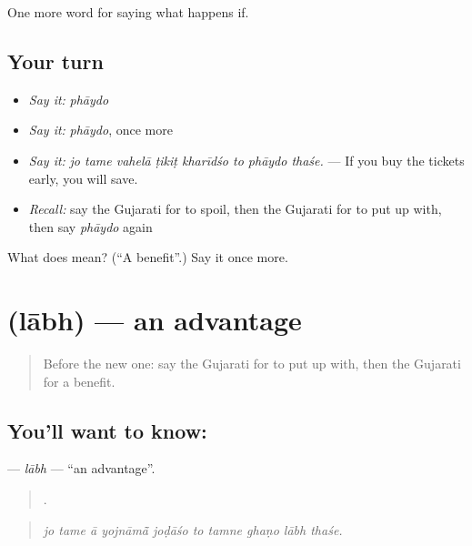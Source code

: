 \begin{grammarlens}[title={What you've built}]
One more word for saying what happens if.
\end{grammarlens}

\subsection*{Your turn}
\begin{itemize}
\raggedright
  \item \emph{Say it:} \emph{phāydo}
  \item \emph{Say it:} \emph{phāydo}, once more
  \item \emph{Say it:} \emph{jo tame vahelā ṭikiṭ kharīdśo to phāydo thaśe.} — If you buy the tickets early, you will save.
  \item \emph{Recall:} say the Gujarati for to spoil, then the Gujarati for to put up with, then say \emph{phāydo} again
\end{itemize}

\begin{tcolorbox}[breakable,colback=teal!4,colframe=teal!35!black,title={Before you move on}]
What does  mean? (\textquotedblleft{}A benefit\textquotedblright{}.) Say it once more.
\end{tcolorbox}
\section[\texorpdfstring{\gu{લાભ} (lābh)}{લાભ (lābh)}]{ (lābh) — an advantage}

\label{lesson:GU-C371-labh}



\begin{quote}
Before the new one: say the Gujarati for to put up with, then the Gujarati for a benefit.
\end{quote}

\subsection*{You'll want to know: }
\textbf{} — \emph{lābh} — \textquotedblleft{}an advantage\textquotedblright{}.

\begin{quote}
         .
\end{quote}

\begin{quote}
\emph{jo tame ā yojnāmā̃ joḍāśo to tamne ghaṇo lābh thaśe.}
\end{quote}

